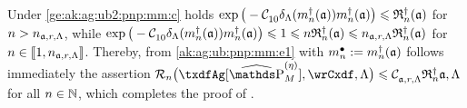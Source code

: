 \begin{pro} Under
  \ref{ge:ak:ag:ub2:pnp:mm:c} holds  
  $\exp\big(-\cst{10}\cmiSv[\aDi{\ssY}({\xdfCw[]})]\aDi{\ssY}({\xdfCw[]})\big)\leq
  \naRa{(\xdfCw[])}$  for $\ssY> \ssY_{\xdfCw[],\xdfCr,\Lambda}$, while 
  $\exp\big(-\cst{10}\cmiSv[\aDi{\ssY}({\xdfCw[]})]\aDi{\ssY}({\xdfCw[]})\big)\leq1\leq
  \ssY\naRa{(\xdfCw[])}\leq \ssY_{\xdfCw[],\xdfCr,\Lambda}
  \naRa{{(\xdfCw[])}}$ for $\ssY\in\nset{1,\ssY_{\xdfCw[],\xdfCr,\Lambda}}$. Thereby, from
  \eqref{ak:ag:ub:pnp:mm:e1} with $\sDi{\ssY}:=\aDi{\ssY}({\xdfCw[]})$
  follows immediately the assertion
    $\nRi{\txdfAg[{\erWe[]}]}{\rwCxdf,\Lambda}
    \leq \cst{\xdfCw[],\xdfCr,\Lambda} \naRa{\xdfCw[],\Lambda}$ for all
    $\ssY\in\Nz$, which  completes the
proof of .\proEnd\end{pro}


